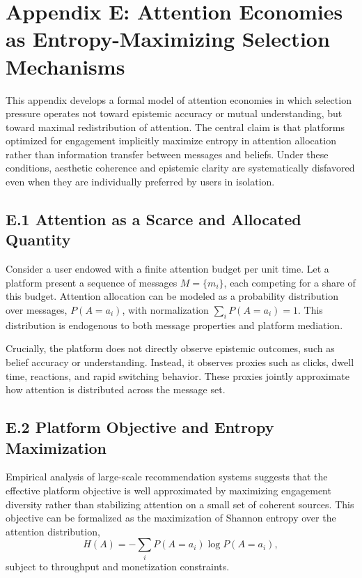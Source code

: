 \documentclass[11pt]{article}
\begin{document}
\section{Appendix E: Attention Economies as Entropy-Maximizing Selection Mechanisms}
\label{app:attention-detailed}

This appendix develops a formal model of attention economies in which selection pressure operates not toward epistemic accuracy or mutual understanding, but toward maximal redistribution of attention. The central claim is that platforms optimized for engagement implicitly maximize entropy in attention allocation rather than information transfer between messages and beliefs. Under these conditions, aesthetic coherence and epistemic clarity are systematically disfavored even when they are individually preferred by users in isolation.

\subsection{E.1 Attention as a Scarce and Allocated Quantity}

Consider a user endowed with a finite attention budget per unit time. Let a platform present a sequence of messages \(M = \{m_i\}\), each competing for a share of this budget. Attention allocation can be modeled as a probability distribution over messages, \(P(A = a_i)\), with normalization \(\sum_i P(A = a_i) = 1\). This distribution is endogenous to both message properties and platform mediation.

Crucially, the platform does not directly observe epistemic outcomes, such as belief accuracy or understanding. Instead, it observes proxies such as clicks, dwell time, reactions, and rapid switching behavior. These proxies jointly approximate how attention is distributed across the message set.

\subsection{E.2 Platform Objective and Entropy Maximization}

Empirical analysis of large-scale recommendation systems suggests that the effective platform objective is well approximated by maximizing engagement diversity rather than stabilizing attention on a small set of coherent sources. This objective can be formalized as the maximization of Shannon entropy over the attention distribution,
\[
H(A) = -\sum_i P(A = a_i)\log P(A = a_i),
\]
subject to throughput and monetization constraints.
\end{document}
